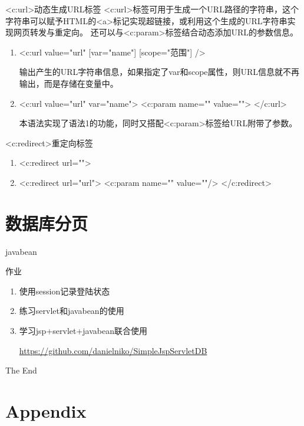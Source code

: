 \documentclass{beamer}
\begin{document}
\begin{frame}{<c:url>动态生成URL标签}
<c:url>标签可用于生成一个URL路径的字符串，这个字符串可以赋予HTML的<a>标记实现超链接，或利用这个生成的URL字符串实现网页转发与重定向。
还可以与<c:param>标签结合动态添加URL的参数信息。
\begin{enumerate}
\item <c:url value="url" [var="name"] [scope="范围"] />

输出产生的URL字符串信息，如果指定了var和scope属性，则URL信息就不再输出，而是存储在变量中。
\item <c:url value="url" var="name"> <c:param name="" value=""> </c:url>

本语法实现了语法1的功能，同时又搭配<c:param>标签给URL附带了参数。
\end{enumerate}
\end{frame}
\begin{frame}{<c:redirect>重定向标签}
\begin{enumerate}
\item
<c:redirect url="">
\item
<c:redirect url="url"> <c:param name="" value=""/> </c:redirect>
\end{enumerate}
\end{frame}

\section{数据库分页}
\begin{frame}
\Huge{\centerline{javabean}}
\end{frame}
\begin{frame}{作业}
\begin{enumerate}
\item
使用session记录登陆状态
\item
练习servlet和javabean的使用
\item
学习jsp+servlet+javabean联合使用

\url{https://github.com/danielniko/SimpleJspServletDB}
\end{enumerate}
\end{frame}

\begin{frame}
\Huge{\centerline{The End}}
\end{frame}

\section{Appendix}
\end{document}
